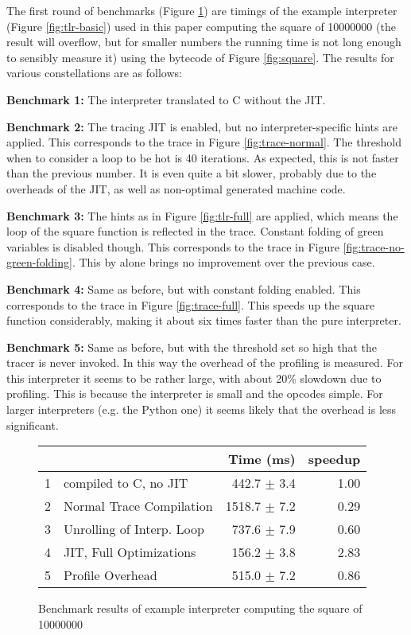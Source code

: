 \documentclass{sig-alternate}
\begin{document}
The first round of benchmarks (Figure \ref{fig:bench1}) are timings of the
example interpreter (Figure \ref{fig:tlr-basic}) used in this paper computing
the square of 10000000 (the result will overflow, but for smaller numbers the
running time is not long enough to sensibly measure it)
using the bytecode of Figure \ref{fig:square}. The results for various
constellations are as follows:

\textbf{Benchmark 1:} The interpreter translated to C without the JIT.

\textbf{Benchmark 2:} The tracing JIT is enabled, but no inter\-preter-specific
hints are applied. This corresponds to the trace in Figure
\ref{fig:trace-normal}.  The threshold when to consider a loop to be hot is 40
iterations.  As expected, this is not faster than the previous number. It is
even quite a bit slower, probably due to the overheads of the JIT, as well as
non-optimal generated machine code.

\textbf{Benchmark 3:} The hints as in Figure \ref{fig:tlr-full} are applied, which means the loop of
the square function is reflected in the trace. Constant folding of green
variables is disabled though. This corresponds to the trace in Figure
\ref{fig:trace-no-green-folding}. This by alone brings no improvement over the
previous case.

\textbf{Benchmark 4:} Same as before, but with constant folding enabled. This corresponds to the
trace in Figure \ref{fig:trace-full}. This speeds up the square function considerably,
making it about six times faster than the pure interpreter.

\textbf{Benchmark 5:} Same as before, but with the threshold set so high that the tracer is
never invoked. In this way the overhead of the profiling is measured. For this interpreter
it seems to be rather large, with about 20\% slowdown due to profiling. This is because the interpreter 
is small and the opcodes simple. For larger interpreters (e.g. the Python one) it seems 
likely that the overhead is less significant.

\begin{figure}
\noindent
\begin{tabular}{|l|l|r|r|}
\hline
& &Time (ms) &speedup\\
\hline
1 &compiled to C, no JIT &442.7 $\pm$ 3.4 &1.00\\
2 &Normal Trace Compilation &1518.7 $\pm$ 7.2 &0.29\\
3 &Unrolling of Interp. Loop &737.6 $\pm$ 7.9 &0.60\\
4 &JIT, Full Optimizations &156.2 $\pm$ 3.8 &2.83\\
5 &Profile Overhead &515.0 $\pm$ 7.2 &0.86\\
\hline
\end{tabular}
\label{fig:bench1}
\caption{Benchmark results of example interpreter computing the square of
10000000}
\end{figure}
\end{document}
